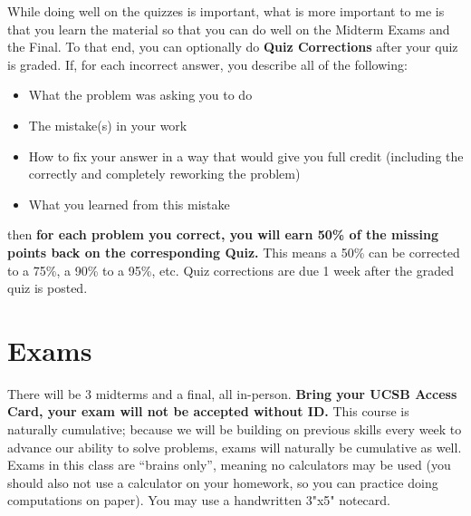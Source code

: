 \documentclass[11pt,letterpaper]{article}
\begin{document}
While doing well on the quizzes is important, what is more important to me is that you learn the material so that you can do well on the Midterm Exams and the Final. To that end, you can optionally do \textbf{Quiz Corrections} after your quiz is graded. If, for each incorrect answer, you describe all of the following:
\begin{itemize}[nosep]
\item What the problem was asking you to do
\item The mistake(s) in your work
\item How to fix your answer in a way that would give you full credit (including the correctly and completely reworking the problem)
\item What you learned from this mistake
\end{itemize}
then \textbf{for each problem you correct, you will earn 50\% of the missing points back on the corresponding Quiz. }This means a 50\% can be corrected to a 75\%, a 90\% to a 95\%, etc. Quiz corrections are due 1 week after the graded quiz is posted.

\section*{Exams}
There will be 3 midterms and a final, all in-person. \textbf{Bring your UCSB Access Card, your exam will not be accepted without ID.} This course is naturally cumulative; because we will be building on previous skills every week to advance our ability to solve problems, exams will naturally be cumulative as well. Exams in this class are “brains only”, meaning no calculators may be used (you should also not use a calculator on your homework, so you can practice doing computations on paper). You may use a handwritten 3"x5" notecard.
\end{document}
